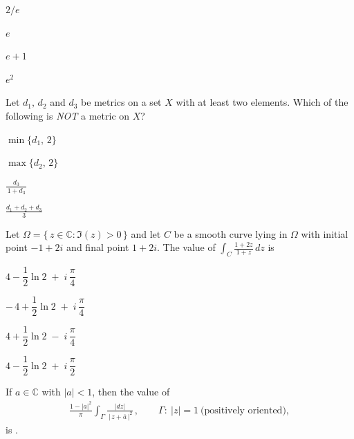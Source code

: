 \documentclass[journal,12pt,onecolumn]{IEEEtran}
\theoremstyle{remark}
\begin{document}
\begin{enumerate}
{\begin{enumerate}
\begin{multicols}{4}
\item $2/e$
\item $e$
\item $e+1$
\item $e^{2}$
\end{multicols}
\end{enumerate}

\item Let $d_1,\,d_2$ and $d_3$ be metrics on a set $X$ with at least two elements.
Which of the following is \emph{NOT} a metric on $X$?

\hfill{}

\begin{enumerate}
\begin{multicols}{2}
\item $\min\{d_1,\,2\}$
\item $\max\{d_2,\,2\}$
\item $\displaystyle \frac{d_3}{\,1+d_3\,}$
\item $\displaystyle \frac{d_1+d_2+d_3}{3}$
\end{multicols}
\end{enumerate}

\item Let $\Omega=\{\,z\in\mathbb{C}:\Im(z)>0\,\}$ and let $C$ be a smooth curve
lying in $\Omega$ with initial point $-1+2i$ and final point $1+2i$.  
The value of $\displaystyle \int_{C}\frac{1+2z}{1+z}\,dz$ is

\hfill{}

\begin{enumerate}
\begin{multicols}{2}
\item $4-\dfrac{1}{2}\ln 2\;+\;i\,\dfrac{\pi}{4}$
\item $-\,4+\dfrac{1}{2}\ln 2\;+\;i\,\dfrac{\pi}{4}$
\item $4+\dfrac{1}{2}\ln 2\;-\;i\,\dfrac{\pi}{4}$
\item $4-\dfrac{1}{2}\ln 2\;+\;i\,\dfrac{\pi}{2}$
\end{multicols}
\end{enumerate}

\item If $a\in\mathbb{C}$ with $|a|<1$, then the value of
\begin{align*}
\frac{1-|a|^{2}}{\pi}\int_{\Gamma}\frac{|dz|}{\,|\,z+\overline{a}\,|^{2}}\,, 
\qquad \Gamma:\ |z|=1\ \text{(positively oriented)},
\end{align*}
is \underline{\hspace{3.0cm}}.

}
\end{enumerate}
\end{document}
